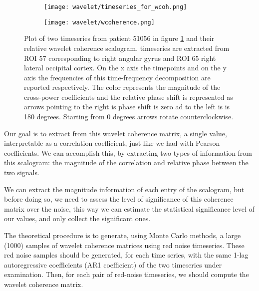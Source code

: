 \documentclass[11pt]{report}
\begin{document}
\begin{figure}
\begin{subfigure}{0.5\textwidth}
\texttt{[image: wavelet/timeseries\_for\_wcoh.png]}
\caption{}
\label{fig:wcoherence_timeseries}
\end{subfigure}
\begin{subfigure}{0.5\textwidth}
\texttt{[image: wavelet/wcoherence.png]}
\caption{}
\label{fig:wcoherence_scalogram}
\end{subfigure}
\caption{Plot of two timeseries from patient 51056 in figure \ref{fig:wcoherence_timeseries} and their relative wavelet coherence scalogram.
timeseries are extracted from ROI 57 corresponding to right angular gyrus and ROI 65 right lateral occipital cortex.
On the x axis the timepoints and on the y axis the frequencies of this time-frequency decomposition are reported respectively.
The color represents the magnitude of the cross-power coefficients and the relative phase shift is represented as arrows pointing to the right is phase shift is zero ad to the left is is 180 degrees. Starting from 0 degrees arrows rotate counterclockwise.
}
\label{fig:wcoherence}
\end{figure}

Our goal is to extract from this wavelet coherence matrix, a single value, interpretable as a correlation coefficient, just like we had with Pearson coefficients.
We can accomplish this, by extracting two types of information from this scalogram: the magnitude of the correlation and relative phase between the two signals.

We can extract the magnitude information of each entry of the scalogram, but before doing so, we need to assess the level of significance of this coherence matrix over the noise, this way we can estimate the statistical significance level of our values, and only collect the significant ones.

The theoretical procedure \cite{grinsted-2004} \cite{bernas-2018} \cite{hartmann-2014} is to generate, using Monte Carlo methods, a large (1000) samples of wavelet coherence matrices using red noise timeseries.
These red noise samples should be generated, for each time series, with the same 1-lag autoregressive coefficients (AR1 coefficient) of the two timeseries under examination.
Then, for each pair of red-noise timeseries, we should compute the wavelet coherence matrix.
\end{document}
